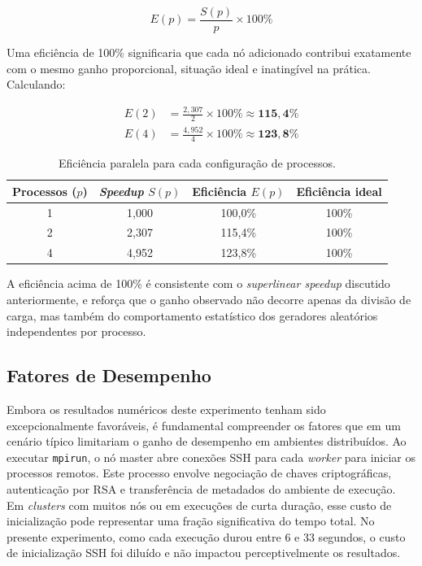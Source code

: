 \documentclass[
	12pt,
	oneside,
	a4paper,
	chapter=TITLE,
	section=TITLE,
	english,
	brazil,
	sumario=tradicional
]{abntex2}
\begin{document}
\begin{equation}
  E(p) = \frac{S(p)}{p} \times 100\%
  \label{eq:eficiencia}
\end{equation}
 
Uma eficiência de 100\% significaria que cada nó adicionado
contribui exatamente com o mesmo ganho proporcional, situação
ideal e inatingível na prática. Calculando:
 
\begin{align}
  E(2) &= \frac{2{,}307}{2} \times 100\% \approx \mathbf{115{,}4\%}
  \label{eq:e2} \\[6pt]
  E(4) &= \frac{4{,}952}{4} \times 100\% \approx \mathbf{123{,}8\%}
  \label{eq:e4}
\end{align}

\begin{table}[htb]
    \centering
    \begin{tabular}{|c|c|c|c|}
        \hline
        \rowcolor{gray!25} 
        \textbf{Processos ($p$)} &
        \textbf{\textit{Speedup} $S(p)$} &
        \textbf{Eficiência $E(p)$} &
        \textbf{Eficiência ideal}  \\ 
        \hline
        1 & 1,000 & 100,0\% & 100\% \\
        \hline
        2 & 2,307 & 115,4\% & 100\% \\
        \hline
        4 & 4,952 & 123,8\% & 100\% \\
        \hline
    \end{tabular}
    \caption{Eficiência paralela para cada configuração de processos.}
    \label{tab:eficiencia}
\end{table}
 
A eficiência acima de 100\% é consistente com o
\textit{superlinear speedup} discutido anteriormente, e
reforça que o ganho observado não decorre apenas da
divisão de carga, mas também do comportamento estatístico
dos geradores aleatórios independentes por processo.

\subsection{Fatores de Desempenho}

Embora os resultados numéricos deste experimento tenham sido
excepcionalmente favoráveis, é fundamental compreender os
fatores que em um cenário típico limitariam o ganho de desempenho
em ambientes distribuídos. Ao executar \texttt{mpirun}, o nó master abre conexões SSH para cada \textit{worker} para iniciar os processos remotos.
Este processo envolve negociação de chaves criptográficas,
autenticação por RSA e transferência de metadados do
ambiente de execução. Em \textit{clusters} com muitos nós ou em
execuções de curta duração, esse custo de inicialização pode
representar uma fração significativa do tempo total. No presente
experimento, como cada execução durou entre 6 e 33 segundos, o
custo de inicialização SSH foi diluído e não impactou
perceptivelmente os resultados.
\end{document}
